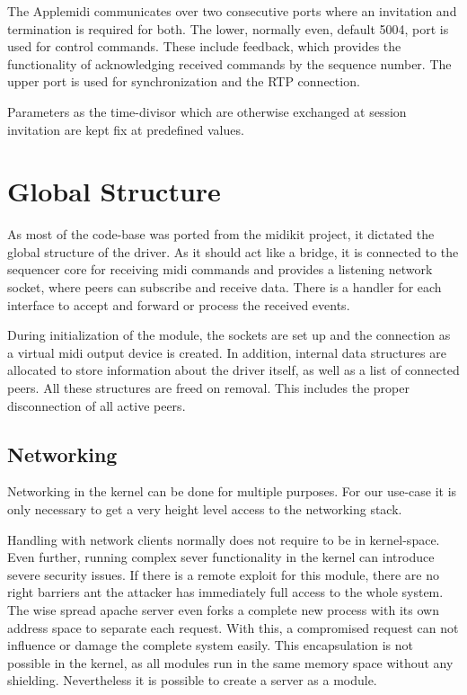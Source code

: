 \documentclass[paper=a4,fontsize=11pt,pagesize,bibtotoc]{scrartcl}
\begin{document}
	The Applemidi communicates over two consecutive ports where an invitation and termination is required for both. The lower, normally even, default 5004, port is used for control commands. These include feedback, which provides the functionality of acknowledging received commands by the sequence number. The upper port is used for synchronization and the RTP connection.
	
	Parameters as the time-divisor
	which are otherwise exchanged at session invitation are kept fix at predefined values.
	
	\section{Global Structure}
	
	As most of the code-base was ported from the midikit project, it dictated the global structure of the driver. As it should act like a bridge, it is connected to the sequencer core for receiving midi commands and provides a listening network socket, where peers can subscribe and receive data. There is a handler for each interface to accept and forward or process the received events.
	
	During initialization of the module, the sockets are set up and the connection as a virtual midi output device is created. In addition, internal data structures are allocated to store information about the driver itself, as well as a list of connected peers. All these structures are freed on removal. This includes the proper disconnection of all active peers.
	
	\subsection{Networking}
	
	Networking in the kernel can be done for multiple purposes. For our use-case it is only necessary to get a very height level access to the networking stack. 
	
	Handling with network clients normally does not require to be in kernel-space. Even further, running complex sever functionality in the kernel can introduce severe security issues. If there is a remote exploit for this module, there are no right barriers ant the attacker has immediately full access to the whole system. The wise spread apache server even forks a complete new process with its own address space to separate each request. With this, a compromised request can not influence or damage the complete system easily.
	This encapsulation is not possible in the kernel, as all modules run in the same memory space without any shielding. Nevertheless it is possible to create a server as a module.
	
\end{document}
